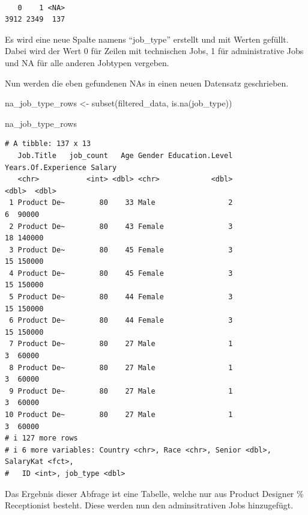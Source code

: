 \documentclass[
  letterpaper,
  DIV=11,
  numbers=noendperiod]{scrartcl}
\newenvironment{Shaded}{\begin{snugshade}}{\end{snugshade}}
\newcommand{\DecValTok}[1]{\textcolor[rgb]{0.68,0.00,0.00}{#1}}
\newcommand{\FunctionTok}[1]{\textcolor[rgb]{0.28,0.35,0.67}{#1}}
\newcommand{\NormalTok}[1]{\textcolor[rgb]{0.00,0.23,0.31}{#1}}
\newcommand{\OtherTok}[1]{\textcolor[rgb]{0.00,0.23,0.31}{#1}}
\newcommand{\SpecialCharTok}[1]{\textcolor[rgb]{0.37,0.37,0.37}{#1}}
\newcommand{\StringTok}[1]{\textcolor[rgb]{0.13,0.47,0.30}{#1}}
\begin{document}
\begin{verbatim}

   0    1 <NA> 
3912 2349  137 
\end{verbatim}

Es wird eine neue Spalte namens ``job\_type'' erstellt und mit Werten
gefüllt. Dabei wird der Wert 0 für Zeilen mit technischen Jobs, 1 für
administrative Jobs und NA für alle anderen Jobtypen vergeben.

Nun werden die eben gefundenen NAs in einen neuen Datensatz geschrieben.

\begin{Shaded}
\begin{Highlighting}[]
\NormalTok{na\_job\_type\_rows }\OtherTok{\textless{}{-}} \FunctionTok{subset}\NormalTok{(filtered\_data, }\FunctionTok{is.na}\NormalTok{(job\_type))}

\NormalTok{na\_job\_type\_rows}
\end{Highlighting}
\end{Shaded}

\begin{verbatim}
# A tibble: 137 x 13
   Job.Title   job_count   Age Gender Education.Level Years.Of.Experience Salary
   <chr>           <int> <dbl> <chr>            <dbl>               <dbl>  <dbl>
 1 Product De~        80    33 Male                 2                   6  90000
 2 Product De~        80    43 Female               3                  18 140000
 3 Product De~        80    45 Female               3                  15 150000
 4 Product De~        80    45 Female               3                  15 150000
 5 Product De~        80    44 Female               3                  15 150000
 6 Product De~        80    44 Female               3                  15 150000
 7 Product De~        80    27 Male                 1                   3  60000
 8 Product De~        80    27 Male                 1                   3  60000
 9 Product De~        80    27 Male                 1                   3  60000
10 Product De~        80    27 Male                 1                   3  60000
# i 127 more rows
# i 6 more variables: Country <chr>, Race <chr>, Senior <dbl>, SalaryKat <fct>,
#   ID <int>, job_type <dbl>
\end{verbatim}

Das Ergebnis dieser Abfrage ist eine Tabelle, welche nur aus Product
Designer \% Receptionist besteht. Diese werden nun den adminsitrativen
Jobs hinzugefügt.

\begin{Shaded}
\end{Shaded}
\end{document}
